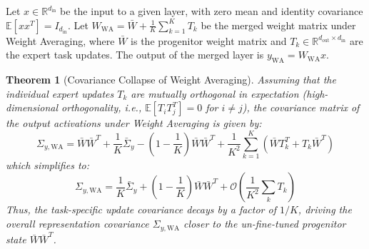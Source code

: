 \documentclass{article}
\theoremstyle{plain}
\newtheorem*{theorem*}{Theorem}
\theoremstyle{definition}
\theoremstyle{remark}
\begin{document}
Let $x \in \mathbb{R}^{d_{\text{in}}}$ be the input to a given layer, with zero mean and identity covariance $\mathbb{E}[x x^T] = I_{d_{\text{in}}}$. Let $W_{\text{WA}} = \bar{W} + \frac{1}{K} \sum_{k=1}^K T_k$ be the merged weight matrix under Weight Averaging, where $\bar{W}$ is the progenitor weight matrix and $T_k \in \mathbb{R}^{d_{\text{out}} \times d_{\text{in}}}$ are the expert task updates. The output of the merged layer is $y_{\text{WA}} = W_{\text{WA}} x$.

\begin{theorem*}[Covariance Collapse of Weight Averaging]
Assuming that the individual expert updates $T_k$ are mutually orthogonal in expectation (high-dimensional orthogonality, i.e., $\mathbb{E}[T_i T_j^T] = 0$ for $i \neq j$), the covariance matrix of the output activations under Weight Averaging is given by:
\begin{equation}
\Sigma_{y, \text{WA}} = \bar{W} \bar{W}^T + \frac{1}{K} \bar{\Sigma}_y - \left(1 - \frac{1}{K}\right) \bar{W} \bar{W}^T + \frac{1}{K^2} \sum_{k=1}^K \left( \bar{W} T_k^T + T_k \bar{W}^T \right)
\end{equation}
which simplifies to:
\begin{equation}
\Sigma_{y, \text{WA}} = \frac{1}{K} \bar{\Sigma}_y + \left( 1 - \frac{1}{K} \right) \bar{W} \bar{W}^T + \mathcal{O}\left( \frac{1}{K^2} \sum_k T_k \right)
\end{equation}
Thus, the task-specific update covariance decays by a factor of $1/K$, driving the overall representation covariance $\Sigma_{y, \text{WA}}$ closer to the un-fine-tuned progenitor state $\bar{W} \bar{W}^T$.
\end{theorem*}
\end{document}
